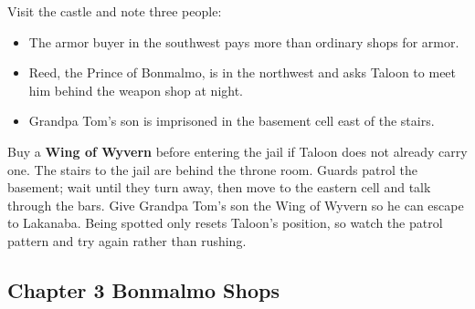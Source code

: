 \documentclass[
  american,
  10pt,
  letterpaper,
  oneside,
  open=any]{scrreprt}
\providecommand{\tightlist}{%
  \setlength{\itemsep}{0pt}\setlength{\parskip}{0pt}}
\begin{document}
Visit the castle and note three people:

\begin{itemize}
\tightlist
\item
  The armor buyer in the southwest pays more than ordinary shops for
  armor.
\item
  Reed, the Prince of Bonmalmo, is in the northwest and asks Taloon to
  meet him behind the weapon shop at night.
\item
  Grandpa Tom's son is imprisoned in the basement cell east of the
  stairs.
\end{itemize}

Buy a \textbf{Wing of Wyvern} before entering the jail if Taloon does
not already carry one. The stairs to the jail are behind the throne
room. Guards patrol the basement; wait until they turn away, then move
to the eastern cell and talk through the bars. Give Grandpa Tom's son
the Wing of Wyvern so he can escape to Lakanaba. Being spotted only
resets Taloon's position, so watch the patrol pattern and try again
rather than rushing.

\subsection{Chapter 3 Bonmalmo Shops}\label{chapter-3-bonmalmo-shops}
\end{document}
